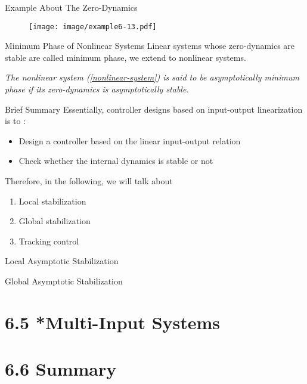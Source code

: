 \documentclass{beamer}
\begin{document}
\begin{frame}{Example About The Zero-Dynamics}
    \begin{figure}
      \centering
      \texttt{[image: image/example6-13.pdf]}
    \end{figure}
\end{frame}


\begin{frame}{Minimum Phase of Nonlinear Systems}
    Linear systems whose zero-dynamics are stable are called {\color{red}minimum phase}, we extend to nonlinear systems.
    \begin{definition}[6.8]
        \textit{
        The nonlinear system (\ref{nonlinear-system}) is said to be {\color{red}asymptotically minimum phase} if its zero-dynamics is asymptotically stable.
        }
    \end{definition}
\end{frame}

\begin{frame}{Brief Summary}
    Essentially, controller designs based on {\color{red}input-output linearization} is to :
    \begin{itemize}
      \item Design a controller based on the linear input-output relation
      \item Check whether the internal dynamics is stable or not
    \end{itemize}
     Therefore, in the following, we will talk about
     \begin{enumerate}
       \item Local stabilization
       \item Global stabilization
       \item Tracking control
     \end{enumerate}
\end{frame}


\begin{frame}{Local Asymptotic Stabilization}

\end{frame}


\begin{frame}{Global Asymptotic Stabilization}

\end{frame}



\section{6.5  *Multi-Input Systems}

\section{6.6  Summary}
\end{document}
